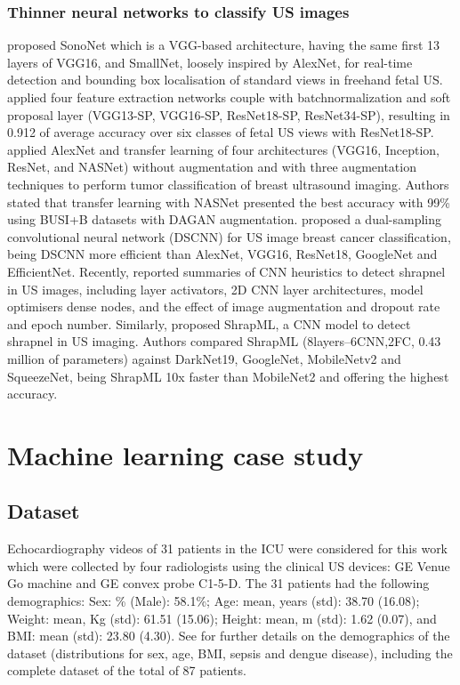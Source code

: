\documentclass[mlabstract,twocolumn]{jmlr}
\begin{document}
\subsubsection{Thinner neural networks to classify US images} \label{subsec:thinnerNets}
\citet{baumgartner2017-IEEETransMedImag} proposed SonoNet which is a VGG-based architecture, having the same first 13 layers of VGG16, and SmallNet, loosely inspired by AlexNet, for real-time detection and bounding box localisation of standard views in freehand fetal US.
\citet{toussaint2018-MICCAI} applied four feature extraction networks couple with batchnormalization and soft proposal layer (VGG13-SP, VGG16-SP, ResNet18-SP, ResNet34-SP), resulting in 0.912 of average accuracy over six classes of fetal US views with ResNet18-SP.
\citet{Al-Dhabyani2019-IJACSA} applied AlexNet and transfer learning of four architectures (VGG16, Inception, ResNet, and NASNet) without augmentation and with three augmentation techniques to perform tumor classification of breast ultrasound imaging.
Authors stated that transfer learning with NASNet presented the best accuracy with 99\% using BUSI+B datasets with DAGAN augmentation.
\citet{xie2020-physics-in-medicine-biology} proposed a dual-sampling convolutional neural network (DSCNN) for US image breast cancer classification, being DSCNN more efficient than AlexNet, VGG16, ResNet18, GoogleNet and EfficientNet.
Recently, \citet{snider2022-ScientificReports} reported summaries of CNN heuristics to detect shrapnel in US images, including layer activators, 2D CNN layer architectures, model optimisers dense nodes, and the effect of image augmentation and dropout rate and epoch number.
Similarly, \citet{boice2022-in-jimaging} proposed ShrapML, a CNN model to detect shrapnel in US imaging.
Authors compared ShrapML (8layers--6CNN,2FC, 0.43 million of parameters) against DarkNet19, GoogleNet, MobileNetv2 and SqueezeNet, being ShrapML 10x faster than MobileNet2 and offering the highest accuracy.

\section{Machine learning case study}
\subsection{Dataset}
Echocardiography videos of 31 patients in the ICU were considered for this work which were collected by four radiologists using the clinical US devices: GE Venue Go machine and GE convex probe C1-5-D.
The 31 patients had the following demographics:
Sex: \% (Male): 58.1\%;
Age: mean, years (std): 38.70 (16.08);
Weight: mean, Kg (std): 61.51 (15.06);
Height: mean, m (std): 1.62 (0.07), and 
BMI: mean (std): 23.80 (4.30).
See  for further details on the demographics of the dataset (distributions for sex, age, BMI, sepsis and dengue disease), including the complete dataset of the total of 87 patients.
\end{document}

